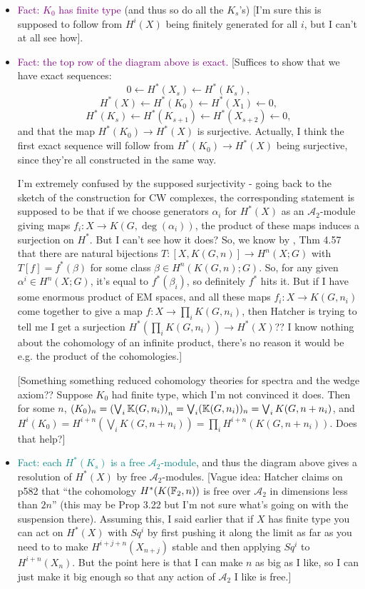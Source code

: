 \documentclass{MetricNotes2023}
\def\bb{\ensuremath\mathbb}
\def\A{\ensuremath{\mathscr{A}_2}}
\def\textcolour{\textcolor}
\begin{document}
\begin{itemize}
\item \textcolour{purple}{Fact: \(K_0\) has finite type} (and thus so do all the \(K_s\)'s) [I'm sure this is supposed to follow from \(H^i(X)\) being finitely generated for all \(i\), but I can't at all see how].
\item \textcolour{purple}{Fact: the top row of the diagram above is exact.} [Suffices to show that we have exact sequences: 
\[0 \leftarrow H^*(X_s)\leftarrow H^*(K_s),\]
\[H^*(X) \leftarrow H^*(K_0) \leftarrow H^*(X_1)\leftarrow 0,\]
\[H^*(K_s) \leftarrow H^*(K_{s+1}) \leftarrow H^*(X_{s+2})\leftarrow 0,\]
and that the map \(H^*(K_0)\to H^*(X)\) is surjective. Actually, I think the first exact sequence will follow from \(H^*(K_0)\to H^*(X)\) being surjective, since they're all constructed in the same way.

I'm extremely confused by the supposed surjectivity - going back to the sketch of the construction for CW complexes, the corresponding statement is supposed to be that if we choose generators \(\alpha_i\) for \(H^*(X)\) as an \(\A\)-module giving maps \(f_i : X \to K(G, \deg(\alpha_i))\), the product of these maps induces a surjection on \(H^*\). But I can't see how it does? So, we know by \autocite{hatcher}, Thm 4.57  that there are natural bijections \(T : [X, K(G,n)]\to H^n(X;G)\) with \(T[f]=f^*(\beta)\) for some class \(\beta \in H^n(K(G,n); G)\). So, for any given \(\alpha^i\in H^n(X;G)\), it's equal to \(f^*(\beta_i)\), so definitely \(f^*\) hits it. But if I have some enormous product of EM spaces, and all these maps \(f_i : X \to K(G, n_i)\) come together to give a map \(f : X \to \prod_i K(G,n_i)\), then Hatcher is trying to tell me I get a surjection \(H^*(\prod_i K(G, n_i))\to H^*(X)\)?? I know nothing about the cohomology of an infinite product, there's no reason it would be e.g. the product of the cohomologies.]

[Something something reduced cohomology theories for spectra and the wedge axiom?? Suppose \(K_0\) had finite type, which I'm not convinced it does. Then for some \(n\), \((K_0)_n=\left(\bigvee_i \bb{K}(G, n_i)\right)_n=\bigvee_i (\bb{K}(G, n_i))_n=\bigvee_i K(G, n+n_i)\), and \(H^i(K_0)=H^{i+n}(\bigvee_i K(G, n+n_i))=\prod_i H^{i+n}(K(G, n+n_i))\). Does that help?]

\item \textcolour{teal}{Fact: each \(H^*(K_s)\) is a free \(\A\)-module}, and thus the diagram above gives a resolution of \(H^*(X)\) by free \(\A\)-modules. [Vague idea: Hatcher claims on p582 that ``the cohomology \(H^*(K(\bb{F}_2,n))\) is free over \(\A\) in dimensions less than \(2n\)'' (this may be \autocite{ass} Prop 3.22 but I'm not sure what's going on with the suspension there). Assuming this, I said earlier that if \(X\) has finite type you can act on \(H^*(X)\) with \(Sq^i\) by first pushing it along the limit as far as you need to to make \(H^{i+j+n}(X_{n+j})\) stable and then applying \(Sq^i\) to \(H^{i+n}(X_n)\). But the point here is that I can make \(n\) as big as I like, so I can just make it big enough so that any action of \(\A\) I like is free.]
\end{itemize}
\end{document}

